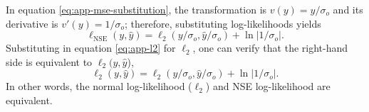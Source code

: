 \documentclass{article}
\begin{document}
In equation \ref{eq:app-mse-substitution},
the transformation is $v(y) = y / \sigma_o$ and its derivative is $v'(y) = 1 / \sigma_o$;
therefore, substituting log-likelihoods yields
\begin{equation}
  \ell_{\text{NSE}}(y, \hat{y}) = \ell_2(y / \sigma_o, \hat{y} / \sigma_o) + \ln | 1 / \sigma_o | \text{.}
  \label{eq:app-l2-substitution}
\end{equation}
Substituting in equation \ref{eq:app-l2} for $\ell_2$,
one can verify that the right-hand side is equivalent to $\ell_2(y, \hat{y}$),
\begin{equation}
  \ell_2(y, \hat{y}) = \ell_2(y / \sigma_o, \hat{y} / \sigma_o) + \ln | 1 / \sigma_o | \text{.}
\end{equation}
In other words, the normal log-likelihood ($\ell_2$) and NSE log-likelihood are equivalent.

\end{document}
